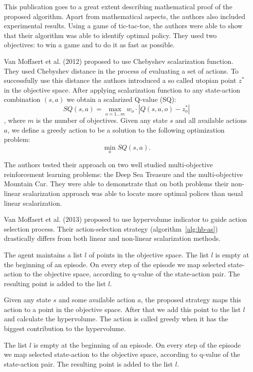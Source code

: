This publication goes to a great extent describing mathematical proof of the proposed algorithm. Apart from mathematical aspects, the authors also included experimental results. Using a game of tic-tac-toe, the authors were able to show that their algorithm was able to identify optimal policy. They used two objectives: to win a game and to do it as fast as possible.

Van Moffaert et al. (2012)\nocite{van2012scalarized} proposed to use Chebyshev scalarization function. They used Chebyshev distance in the process of evaluating a set of actions. To successfully use this distance the authors introduced a so called utopian point $z^{*}$ in the objective space. After applying scalarization function to any state-action combination $(s,a)$ we obtain a scalarized Q-value (SQ):
$$ SQ(s,a) = \max_{o=1...m} w_{o} \cdot | Q(s,a,o) - z^{*}_{o} | $$
, where $m$ is the number of objectives. Given any state $s$ and all available actions $a$, we define a greedy action to be a solution to the following optimization problem:
$$ \min_{a} SQ(s,a). $$

The authors tested their approach on two well studied multi-objective reinforcement learning problems: the Deep Sea Treasure and the multi-objective Mountain Car. They were able to demonstrate that on both problems their non-linear scalarization approach was able to locate more optimal polices than usual linear scalarization.

Van Moffaert et al. (2013)\nocite{van2013hypervolume} proposed to use hypervolume indicator to guide action selection process. Their action-selection strategy (algorithm~\ref{alg:hb-as}) drastically differs from both linear and non-linear scalarization methods.

The agent maintains a list $l$ of points in the objective space. The list $l$ is empty at the beginning of an episode. On every step of the episode we map selected state-action to the objective space, according to q-value of the state-action pair. The resulting point is added to the list $l$.

Given any state $s$ and some available action $a$, the proposed strategy maps this action to a point in the objective space. After that we add this point to the list $l$ and calculate the hypervolume. The action is called greedy when it has the biggest contribution to the hypervolume.

The list $l$ is empty at the beginning of an episode. On every step of the episode we map selected state-action to the objective space, according to q-value of the state-action pair. The resulting point is added to the list $l$.

